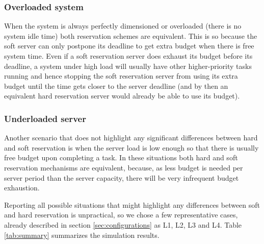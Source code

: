 \documentclass[times, 10pt,twocolumn]{article}
\begin{document}
\subsubsection{Overloaded system}
\label{sec:system-load}

When the system is always perfectly dimensioned or overloaded (there
is no system idle time) both reservation schemes are equivalent. This
is so because the soft server can only postpone its deadline to get
extra budget when there is free system time. Even if a soft
reservation server does exhaust its budget before its deadline, a
system under high load will usually have other higher-priority tasks
running and hence stopping the soft reservation server from using its
extra budget until the time gets closer to the server deadline (and by
then an equivalent hard reservation server would already be able to
use its budget).

\subsubsection{Underloaded server}
\label{sec:server-load}

Another scenario that does not highlight any significant differences
between hard and soft reservation is when the server load is low
enough so that there is usually free budget upon completing a task. In
these situations both hard and soft reservation mechanisms are
equivalent, because, as less budget is needed per server period than
the server capacity, there will be very infrequent budget
exhaustion.

\label{sec:indiv-simul-results}

Reporting all possible situations that might highlight any differences
between soft and hard reservation is unpractical, so we chose a few
representative cases, already described in section
\ref{sec:configurations} as L1, L2, L3 and L4. Table \ref{tab:summary}
summarizes the simulation results.
\end{document}
